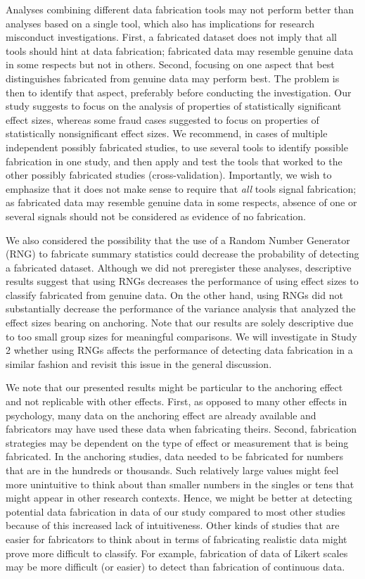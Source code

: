 \documentclass[a5paper]{book}
\begin{document}
Analyses combining different data fabrication tools may not perform
better than analyses based on a single tool, which also has implications
for research misconduct investigations. First, a fabricated dataset does
not imply that all tools should hint at data fabrication; fabricated
data may resemble genuine data in some respects but not in others.
Second, focusing on one aspect that best distinguishes fabricated from
genuine data may perform best. The problem is then to identify that
aspect, preferably before conducting the investigation. Our study
suggests to focus on the analysis of properties of statistically
significant effect sizes, whereas some fraud cases suggested to focus on
properties of statistically nonsignificant effect sizes. We recommend,
in cases of multiple independent possibly fabricated studies, to use
several tools to identify possible fabrication in one study, and then
apply and test the tools that worked to the other possibly fabricated
studies (cross-validation). Importantly, we wish to emphasize that it
does not make sense to require that \emph{all} tools signal fabrication;
as fabricated data may resemble genuine data in some respects, absence
of one or several signals should not be considered as evidence of no
fabrication.

We also considered the possibility that the use of a Random Number
Generator (RNG) to fabricate summary statistics could decrease the
probability of detecting a fabricated dataset. Although we did not
preregister these analyses, descriptive results suggest that using RNGs
decreases the performance of using effect sizes to classify fabricated
from genuine data. On the other hand, using RNGs did not substantially
decrease the performance of the variance analysis that analyzed the
effect sizes bearing on anchoring. Note that our results are solely
descriptive due to too small group sizes for meaningful comparisons. We
will investigate in Study 2 whether using RNGs affects the performance
of detecting data fabrication in a similar fashion and revisit this
issue in the general discussion.

We note that our presented results might be particular to the anchoring
effect and not replicable with other effects. First, as opposed to many
other effects in psychology, many data on the anchoring effect are
already available and fabricators may have used these data when
fabricating theirs. Second, fabrication strategies may be dependent on
the type of effect or measurement that is being fabricated. In the
anchoring studies, data needed to be fabricated for numbers that are in
the hundreds or thousands. Such relatively large values might feel more
unintuitive to think about than smaller numbers in the singles or tens
that might appear in other research contexts. Hence, we might be better
at detecting potential data fabrication in data of our study compared to
most other studies because of this increased lack of intuitiveness.
Other kinds of studies that are easier for fabricators to think about in
terms of fabricating realistic data might prove more difficult to
classify. For example, fabrication of data of Likert scales may be more
difficult (or easier) to detect than fabrication of continuous data.
\end{document}
